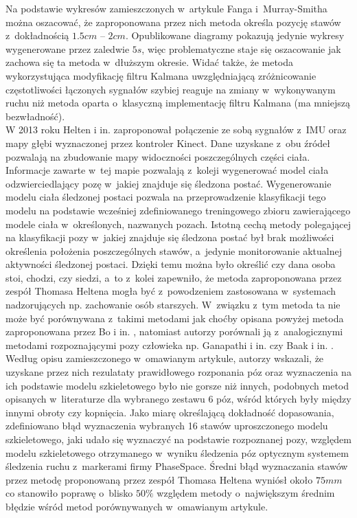 Na podstawie wykresów zamieszczonych w~artykule Fanga i~Murray-Smitha można oszacować, że zaproponowana przez nich metoda określa pozycję stawów z~dokładnością $1.5 cm$ -- $2 cm$. Opublikowane diagramy pokazują jedynie wykresy wygenerowane przez zaledwie $5s$, więc problematyczne staje się oszacowanie jak zachowa się ta metoda w~dłuższym okresie. Widać także, że metoda wykorzystująca modyfikację filtru Kalmana uwzględniającą zróżnicowanie częstotliwości łączonych sygnałów szybiej reaguje na zmiany w~wykonywanym ruchu niż metoda oparta o~klasyczną implementację filtru Kalmana (ma mniejszą bezwładność).\\

W 2013 roku Helten i in. \cite{Helten2013} zaproponował połączenie ze sobą sygnałów z~IMU oraz mapy głębi wyznaczonej przez kontroler Kinect. Dane uzyskane z~obu źródeł pozwalają na zbudowanie mapy widoczności poszczególnych części ciała. Informacje zawarte w~tej mapie pozwalają z~koleji wygenerować model ciała odzwierciedlający pozę w~jakiej znajduje się śledzona postać. Wygenerowanie modelu ciała śledzonej postaci pozwala na przeprowadzenie klasyfikacji tego modelu na podstawie wcześniej zdefiniowanego treningowego zbioru zawierającego modele ciała w~określonych, nazwanych pozach. Istotną cechą metody polegającej na klasyfikacji pozy w~jakiej znajduje się śledzona postać był brak możliwości określenia położenia poszczególnych stawów, a~jedynie monitorowanie aktualnej aktywności śledzonej postaci. Dzięki temu można było określić czy dana osoba stoi, chodzi, czy siedzi, a~to z~kolei zapewniło, że metoda zaproponowana przez zespół Thomasa Heltena mogła być z~powodzeniem zastosowana w~systemach nadzorujących np. zachowanie osób starszych. W~związku z~tym metoda ta nie może być porównywana z~takimi metodami jak choćby opisana powyżej metoda zaproponowana przez Bo i in. \cite{Bo2011a}, natomiast autorzy porównali ją z~analogicznymi metodami rozpoznającymi pozy człowieka np. Ganapathi i in. \cite{Ganapathi2010} czy Baak i in. \cite{Baak2011}. Według opisu zamieszczonego w~omawianym artykule, autorzy wskazali, że uzyskane przez nich rezulataty prawidłowego rozponania póz oraz wyznaczenia na ich podstawie modelu szkieletowego było nie gorsze niż innych, podobnych metod opisanych w~literaturze dla wybranego zestawu 6 póz, wśród których były między innymi obroty czy kopnięcia. Jako miarę określającą dokładność dopasowania, zdefiniowano błąd wyznaczenia wybranych 16 stawów uproszczonego modelu szkieletowego, jaki udało się wyznaczyć na podstawie rozpoznanej pozy, względem modelu szkieletowego otrzymanego w~wyniku śledzenia póz optycznym systemem śledzenia ruchu z~markerami firmy PhaseSpace. Średni błąd wyznaczania stawów przez metodę proponowaną przez zespół Thomasa Heltena wyniósł około $75mm$ co stanowiło poprawę o~blisko $50\%$ względem metody o~największym średnim błędzie wśród metod porównywanych w~omawianym artykule.\\
		
